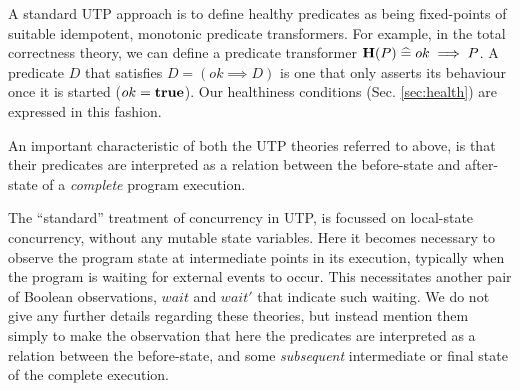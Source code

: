 %
A standard UTP approach is to define healthy predicates
as being fixed-points of suitable idempotent, monotonic predicate transformers.
For example, in the total correctness theory,
we can define a predicate transformer
$\mathbf{H}(P) \mathrel{\widehat=} ok \implies P$.
A predicate $D$ that satisfies $D = (ok \implies D)$
is one that only asserts its behaviour once it is started ($ok=\mathbf{true}$).
Our healthiness conditions (Sec. \ref{sec:health})
are expressed in this fashion.

An important characteristic of both the UTP theories referred to above,
is that their predicates are interpreted as a relation between the before-state
and after-state of a \emph{complete} program execution.

The ``standard'' treatment of concurrency in UTP\cite[Chps. 7,8]{Hoare-He98},
is focussed on local-state concurrency, without any mutable state variables.
Here it becomes necessary to observe the program state at intermediate points
in its execution,
typically when the program is waiting
for external events to occur.
This necessitates another pair of Boolean observations, $wait$ and $wait'$
that indicate such waiting.
We do not give any further details regarding these theories,
but instead mention them simply to make the observation
that here the predicates are interpreted as a relation between
the before-state,
and some \emph{subsequent} intermediate or final state of the complete execution.

